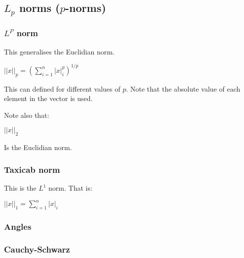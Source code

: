 
\subsection{\(L_p\) norms (\(p\)-norms)}
\subsubsection{\(L^P\) norm}

This generalises the Euclidian norm.

\(||x||_p=(\sum_{i=1}^{n}|x|^p_i)^{1/p}\)

This can defined for different values of \(p\). Note that the absolute value of each element in the vector is used.

Note also that:

\(||x||_2\)

Is the Euclidian norm.

\subsubsection{Taxicab norm}

This is the \(L^1\) norm. That is:

\(||x||_1=\sum_{i=1}^{n}|x|_i\)

\subsubsection{Angles}

\subsubsection{Cauchy-Schwarz}

